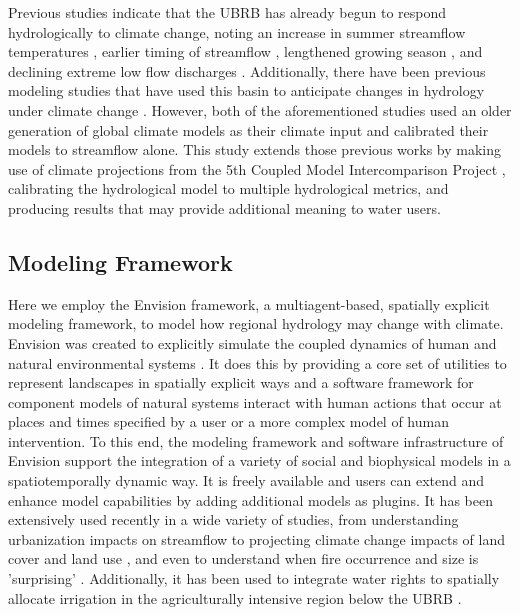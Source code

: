 \documentclass[water,article,submit,moreauthors,pdftex,10pt,a4paper]{mdpi}
\theoremstyle{mdpi}
\newcounter{ex}
\newcounter{re}
\theoremstyle{mdpidefinition}
\begin{document}
Previous studies indicate that the UBRB has already begun to respond hydrologically to climate change, noting an increase in summer streamflow temperatures \citep{Isaak:2010fn}, earlier timing of streamflow \citep{Clark:2010bq}, lengthened growing season \citep{Kunkel:2004bh}, and declining extreme low flow discharges \citep{Kormos:2016hy}. Additionally, there have been previous modeling studies that have used this basin to anticipate changes in hydrology under climate change \citep{Stillwater:2008uf,Jin:2011ii}. However, both of the aforementioned studies used an older generation of global climate models as their climate input and calibrated their models to streamflow alone. This study extends those previous works by making use of climate projections from the 5th Coupled Model Intercomparison Project \citep[CMIP5,][]{Taylor:2012jga}, calibrating the hydrological model to multiple hydrological metrics, and producing results that may provide additional meaning to water users.

\subsection{Modeling Framework}
Here we employ the Envision framework, a multiagent-based, spatially explicit modeling framework, to model how regional hydrology may change with climate. Envision was created to explicitly simulate the coupled dynamics of human and natural environmental systems \citep{Bolte:2007tb}. It does this by providing a core set of utilities to represent landscapes in spatially explicit ways and a software framework for component models of natural systems interact with human actions that occur at places and times specified by a user or a more complex model of human intervention. To this end, the modeling framework and software infrastructure of Envision support the integration of a variety of social and biophysical models in a spatiotemporally dynamic way. It is freely available and users can extend and enhance model capabilities by adding additional models as plugins. It has been extensively used recently in a wide variety of studies, from understanding urbanization impacts on streamflow \citep{Wu:2015tx} to projecting climate change impacts of land cover and land use \citep{Turner:2015wn}, and even to understand when fire occurrence and size is 'surprising' \citep{Hulse:2016wy}. Additionally, it has been used to integrate water rights to spatially allocate irrigation in the agriculturally intensive region below the UBRB \citep{Han:2017tx}. 
\end{document}
